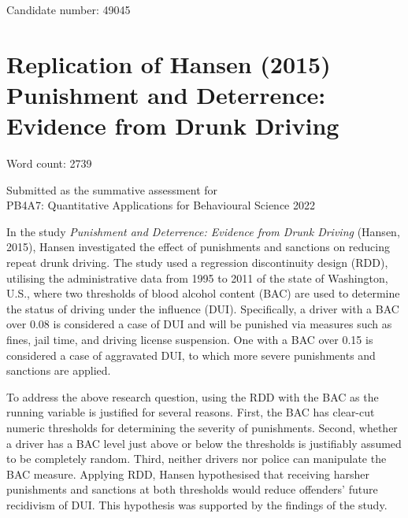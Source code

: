 \documentclass[
  11pt,
]{article}
\author{}
\date{\vspace{-2.5em}}
\begin{document}
\begin{titlepage}

\begin{center}

\vspace*{30mm}

Candidate number: 49045

\vspace*{5mm}

\hypertarget{replication-of-hansen-2015-punishment-and-deterrence-evidence-from-drunk-driving}{%
\section*{Replication of Hansen (2015) Punishment and Deterrence:
Evidence from Drunk
Driving}\label{replication-of-hansen-2015-punishment-and-deterrence-evidence-from-drunk-driving}}

\vspace*{5mm}

Word count: 2739

\vspace*{30mm}

Submitted as the summative assessment for\\

PB4A7: Quantitative Applications for Behavioural Science 2022

\end{center}

\end{titlepage}

\newpage

In the study \emph{Punishment and Deterrence: Evidence from Drunk
Driving} (Hansen, 2015), Hansen investigated the effect of punishments
and sanctions on reducing repeat drunk driving. The study used a
regression discontinuity design (RDD), utilising the administrative data
from 1995 to 2011 of the state of Washington, U.S., where two thresholds
of blood alcohol content (BAC) are used to determine the status of
driving under the influence (DUI). Specifically, a driver with a BAC
over 0.08 is considered a case of DUI and will be punished via measures
such as fines, jail time, and driving license suspension. One with a BAC
over 0.15 is considered a case of aggravated DUI, to which more severe
punishments and sanctions are applied.

To address the above research question, using the RDD with the BAC as
the running variable is justified for several reasons. First, the BAC
has clear-cut numeric thresholds for determining the severity of
punishments. Second, whether a driver has a BAC level just above or
below the thresholds is justifiably assumed to be completely random.
Third, neither drivers nor police can manipulate the BAC measure.
Applying RDD, Hansen hypothesised that receiving harsher punishments and
sanctions at both thresholds would reduce offenders' future recidivism
of DUI. This hypothesis was supported by the findings of the study.
\end{document}
